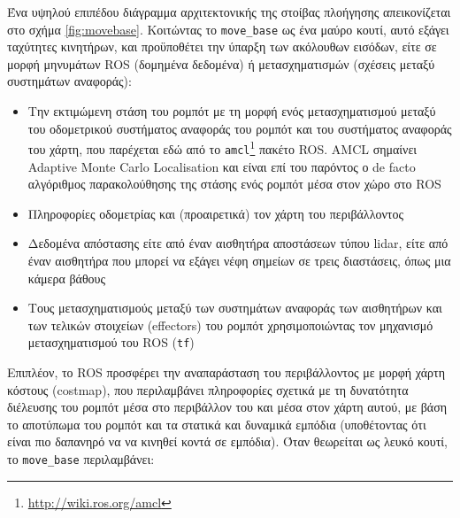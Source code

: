 Ένα υψηλού επιπέδου διάγραμμα αρχιτεκτονικής της στοίβας πλοήγησης
απεικονίζεται στο σχήμα \ref{fig:movebase}. Κοιτώντας το \texttt{move\_base} ως
ένα μαύρο κουτί, αυτό εξάγει ταχύτητες κινητήρων, και προϋποθέτει την ύπαρξη
των ακόλουθων εισόδων, είτε σε μορφή μηνυμάτων ROS (δομημένα δεδομένα) ή
μετασχηματισμών (σχέσεις μεταξύ συστημάτων αναφοράς):

\begin{itemize}
  \item Την εκτιμώμενη στάση του ρομπότ με τη μορφή ενός μετασχηματισμού μεταξύ
        του οδομετρικού συστήματος αναφοράς του ρομπότ και του συστήματος
        αναφοράς του χάρτη, που παρέχεται εδώ από το
        \texttt{amcl}\footnote{\url{http://wiki.ros.org/amcl}} πακέτο ROS.
        AMCL σημαίνει Adaptive Monte Carlo Localisation
        \cite{Grisetti2007,Fox2001} και είναι επί του παρόντος ο de facto
        αλγόριθμος παρακολούθησης της στάσης ενός ρομπότ μέσα στον χώρο στο ROS
  \item Πληροφορίες οδομετρίας και (προαιρετικά) τον χάρτη του περιβάλλοντος
  \item Δεδομένα απόστασης είτε από έναν αισθητήρα αποστάσεων τύπου lidar, είτε
        από έναν αισθητήρα που μπορεί να εξάγει νέφη σημείων σε τρεις
        διαστάσεις, όπως μια κάμερα βάθους
  \item Τους μετασχηματισμούς μεταξύ των συστημάτων αναφοράς
        των αισθητήρων και των τελικών στοιχείων (effectors) του ρομπότ
        χρησιμοποιώντας τον μηχανισμό μετασχηματισμού του ROS (\texttt{tf})
\end{itemize}

Επιπλέον, το ROS προσφέρει την αναπαράσταση του περιβάλλοντος με μορφή
χάρτη κόστους (costmap), που περιλαμβάνει πληροφορίες σχετικά με τη δυνατότητα
διέλευσης του ρομπότ μέσα στο περιβάλλον του και μέσα στον χάρτη αυτού, με βάση
το αποτύπωμα του ρομπότ και τα στατικά και δυναμικά εμπόδια (υποθέτοντας ότι
είναι πιο δαπανηρό να να κινηθεί κοντά σε εμπόδια). Όταν θεωρείται ως λευκό
κουτί, το \texttt{move\_base} περιλαμβάνει:

